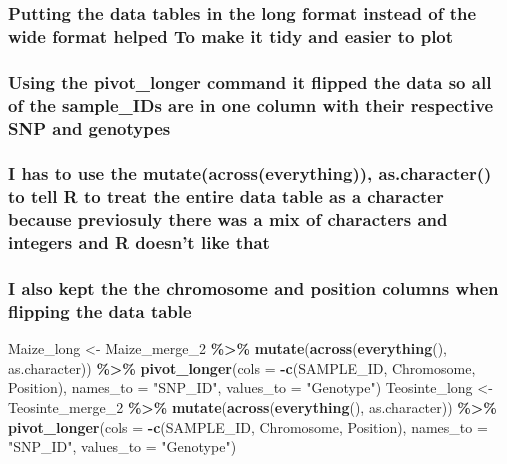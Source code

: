 \documentclass[
]{article}
\newenvironment{Shaded}{\begin{snugshade}}{\end{snugshade}}
\newcommand{\AttributeTok}[1]{\textcolor[rgb]{0.13,0.29,0.53}{#1}}
\newcommand{\FunctionTok}[1]{\textcolor[rgb]{0.13,0.29,0.53}{\textbf{#1}}}
\newcommand{\NormalTok}[1]{#1}
\newcommand{\OtherTok}[1]{\textcolor[rgb]{0.56,0.35,0.01}{#1}}
\newcommand{\SpecialCharTok}[1]{\textcolor[rgb]{0.81,0.36,0.00}{\textbf{#1}}}
\newcommand{\StringTok}[1]{\textcolor[rgb]{0.31,0.60,0.02}{#1}}
\begin{document}
\subsubsection{Putting the data tables in the long format instead of the
wide format helped To make it tidy and easier to
plot}\label{putting-the-data-tables-in-the-long-format-instead-of-the-wide-format-helped-to-make-it-tidy-and-easier-to-plot}

\subsubsection{Using the pivot\_longer command it flipped the data so
all of the sample\_IDs are in one column with their respective SNP and
genotypes}\label{using-the-pivot_longer-command-it-flipped-the-data-so-all-of-the-sample_ids-are-in-one-column-with-their-respective-snp-and-genotypes}

\subsubsection{I has to use the mutate(across(everything)),
as.character() to tell R to treat the entire data table as a character
because previosuly there was a mix of characters and integers and R
doesn't like
that}\label{i-has-to-use-the-mutateacrosseverything-as.character-to-tell-r-to-treat-the-entire-data-table-as-a-character-because-previosuly-there-was-a-mix-of-characters-and-integers-and-r-doesnt-like-that}

\subsubsection{I also kept the the chromosome and position columns when
flipping the data
table}\label{i-also-kept-the-the-chromosome-and-position-columns-when-flipping-the-data-table}

\begin{Shaded}
\begin{Highlighting}[]
\NormalTok{Maize\_long }\OtherTok{\textless{}{-}}\NormalTok{ Maize\_merge\_2 }\SpecialCharTok{\%\textgreater{}\%} \FunctionTok{mutate}\NormalTok{(}\FunctionTok{across}\NormalTok{(}\FunctionTok{everything}\NormalTok{(), as.character)) }\SpecialCharTok{\%\textgreater{}\%} 
  \FunctionTok{pivot\_longer}\NormalTok{(}\AttributeTok{cols =} \SpecialCharTok{{-}}\FunctionTok{c}\NormalTok{(SAMPLE\_ID, Chromosome, Position), }\AttributeTok{names\_to =} \StringTok{"SNP\_ID"}\NormalTok{, }\AttributeTok{values\_to =} \StringTok{"Genotype"}\NormalTok{)}
\NormalTok{Teosinte\_long }\OtherTok{\textless{}{-}}\NormalTok{ Teosinte\_merge\_2 }\SpecialCharTok{\%\textgreater{}\%} \FunctionTok{mutate}\NormalTok{(}\FunctionTok{across}\NormalTok{(}\FunctionTok{everything}\NormalTok{(), as.character)) }\SpecialCharTok{\%\textgreater{}\%} 
  \FunctionTok{pivot\_longer}\NormalTok{(}\AttributeTok{cols =} \SpecialCharTok{{-}}\FunctionTok{c}\NormalTok{(SAMPLE\_ID, Chromosome, Position), }\AttributeTok{names\_to =} \StringTok{"SNP\_ID"}\NormalTok{, }\AttributeTok{values\_to =} \StringTok{"Genotype"}\NormalTok{)}
\end{Highlighting}
\end{Shaded}
\end{document}
